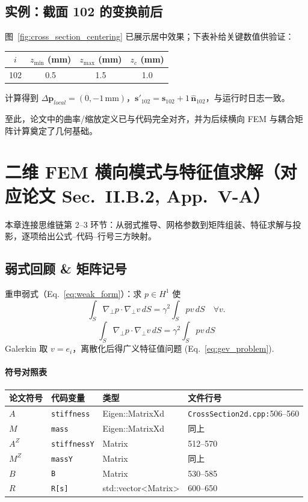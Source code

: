 \documentclass{ctexart}
\begin{document}
\subsection{实例：截面 102 的变换前后}
图~\ref{fig:cross_section_centering} 已展示居中效果；下表补给关键数值供验证：
\begin{table}[h]
\centering
\begin{tabular}{cccc}
\toprule
$i$ & $z_{\min}$ (mm) & $z_{\max}$ (mm) & $z_c$ (mm) \\
\midrule
102 & 0.5 & 1.5 & 1.0 \\
\bottomrule
\end{tabular}
\end{table}
计算得到 $\Delta \mathbf p_{local}=(0,-1\,\mathrm{mm})$，$\mathbf s'_{102}=\mathbf s_{102}+1\,\hat{\mathbf n}_{102}$，与运行时日志一致。

\vspace{0.5em}
至此，论文中的曲率/缩放定义已与代码完全对齐，并为后续横向 FEM 与耦合矩阵计算奠定了几何基础。

\section{二维 FEM 横向模式与特征值求解（对应论文 Sec.~II.B.2, App.~V-A）}
\label{sec:FEM_modes}
本章连接思维链第 2–3 环节：从弱式推导、网格参数到矩阵组装、特征求解与投影，逐项给出公式–代码–行号三方映射。

\subsection{弱式回顾 \& 矩阵记号}
重申弱式（Eq.~\ref{eq:weak_form}）：求 $p\in H^1$ 使
\[\int_S \nabla_\perp p\cdot\nabla_\perp v\,dS = \gamma^2\int_S pv\,dS\quad \forall v.\]
\begin{equation} \label{eq:weak_form}
\int_S \nabla_\perp p\cdot\nabla_\perp v\,dS = \gamma^2\int_S pv\,dS
\end{equation}
Galerkin 取 $v=e_i$，离散化后得广义特征值问题 (Eq.~\ref{eq:gev_problem}).

\paragraph{符号对照表}
\begin{center}
\begin{tabular}{llll}
\toprule
论文符号 & 代码变量 & 类型 & 文件行号 \\
\midrule
$A$ & \texttt{stiffness} & Eigen::MatrixXd &  \texttt{CrossSection2d.cpp:}506--560 \\
$M$ & \texttt{mass} & Eigen::MatrixXd & 同上 \\
$A^Z$ & \texttt{stiffnessY} & Matrix & 512--570 \\
$M^Z$ & \texttt{massY} & Matrix & 同上 \\
$B$ & \texttt{B} & Matrix & 530--585 \\
$R$ & \texttt{R[s]} & std::vector<Matrix> & 600--650 \\
\bottomrule
\end{tabular}
\end{center}
\end{document}
